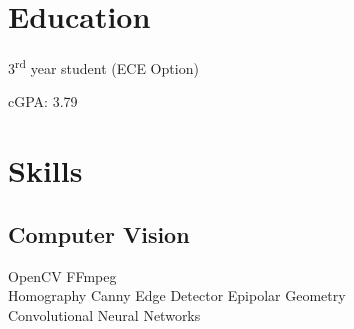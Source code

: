 
\begin{minipage}[t]{0.33\textwidth} %

 \section{Education}

 \vspace{\topsep} %
 \vspace{1pt}
 \begin{tightitemize}
  \item 3\textsuperscript{rd} year student (ECE Option)
  \item cGPA: 3.79
 \end{tightitemize}


 \sectionspace %

 \section{Skills}
 \subsection{Computer Vision}
 OpenCV \textbullet{} FFmpeg \\
 Homography \textbullet{} Canny Edge Detector
 Epipolar Geometry \\
 Convolutional Neural Networks %

 \sectionspace %


\end{minipage}
